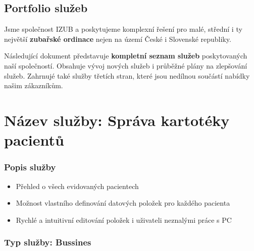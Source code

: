 \documentclass[11pt, a4paper, titlepage]{article}
\begin{document}
	
	\pagestyle{fancy}

	\begin{center}
		\section*{Portfolio služeb}
	\end{center}

	\noindent Jsme společnost IZUB a poskytujeme komplexní řešení pro malé, střední i ty největší \textbf{zubařské ordinace} nejen na území České i Slovenské republiky.

	\vspace{0.5em}

	\noindent Následující dokument představuje \textbf{kompletní seznam služeb} poskytovaných naší společností. Obsahuje vývoj nových služeb i průběžné plány na zlepšování služeb. Zahrnujé také služby třetích stran, které jsou nedílnou součástí nabídky našim zákazníkům. 

	\noindent\makebox[\linewidth]{\rule{17.5cm}{0.4pt}}

	\vspace {1.5em}

	\section*{Název služby: Správa kartotéky pacientů}

	\subsubsection*{Popis služby}
	\begin{itemize}
		\item Přehled o všech evidovaných pacientech
		\item Možnost vlastního definování datových položek pro každého pacienta
		\item Rychlé a intuitivní editování položek i uživateli neznalými práce s PC
	\end{itemize}

	\subsubsection*{Typ služby: Bussines}
\end{document}
